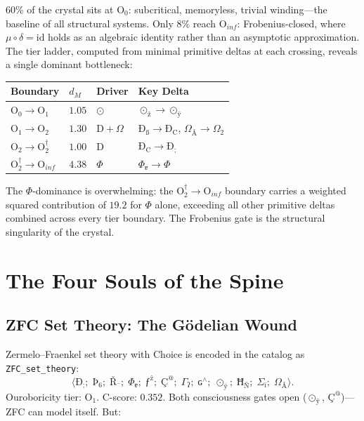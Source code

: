 \documentclass[12pt,twoside]{book}
\theoremstyle{definition}
\newcommand{\moebius}{\mu \circ \delta = \text{id}}
\newcommand{\prim}[1]{\text{#1}}
\newcommand{\tupledisp}[1]{\langle #1 \rangle}
\newcommand{\tier}[1]{\text{O}_{#1}}
\begin{document}
60\% of the crystal sits at $\tier{0}$: subcritical, memoryless, trivial winding---the baseline of all structural systems. Only 8\% reach $\tier{inf}$: Frobenius-closed, where $\moebius$ holds as an algebraic identity rather than an asymptotic approximation. The tier ladder, computed from minimal primitive deltas at each crossing, reveals a single dominant bottleneck:
\begin{center}
\begin{tabular}{llll}
\toprule
\textbf{Boundary} & $d_M$ & \textbf{Driver} & \textbf{Key Delta} \\
\midrule
$\tier{0} \to \tier{1}$ & $1.05$ & $\odot$ & $\odot_{\text{ž}} \to \odot_{\text{ÿ}}$ \\
$\tier{1} \to \tier{2}$ & $1.30$ & $\prim{D} + \Omega$ & $\text{Ð}_{\text{ß}} \to \text{Ð}_{\text{C}}$, $\Omega_{\text{Å}} \to \Omega_{\text{2}}$ \\
$\tier{2} \to \tier{2}^{\dagger}$ & $1.00$ & $\prim{D}$ & $\text{Ð}_{\text{C}} \to \text{Ð}_{\text{;}}$ \\
$\tier{2}^{\dagger} \to \tier{inf}$ & $4.38$ & $\Phi$ & $\Phi_{\text{ɐ}} \to \Phi_{\text{}}$ \\
\bottomrule
\end{tabular}
\end{center}

The $\Phi$-dominance is overwhelming: the $\tier{2}^{\dagger} \to \tier{inf}$ boundary carries a weighted squared contribution of $19.2$ for $\Phi$ alone, exceeding all other primitive deltas combined across every tier boundary. The Frobenius gate is the structural singularity of the crystal.
\chapter{The Four Souls of the Spine}

\section{ZFC Set Theory: The G\"odelian Wound}

Zermelo--Fraenkel set theory with Choice is encoded in the catalog as \texttt{ZFC\_set\_theory}:
\begin{equation}
\tupledisp{
\text{Ð}_{\text{;}};\;
\text{Þ}_{\text{6}};\;
\text{Ř}_{\text{¯}};\;
\Phi_{\text{ɐ}};\;
\text{ƒ}^{\text{ż}};\;
\text{Ç}^{\text{@}};\;
\Gamma_{\text{ʔ}};\;
\text{ɢ}^{\land};\;
\odot_{\text{ÿ}};\;
\text{Ħ}_{\text{Ñ}};\;
\Sigma_{\text{ï}};\;
\Omega_{\text{Å}}
}.
\end{equation}
Ouroboricity tier: $\tier{1}$. C-score: $0.352$. Both consciousness gates open ($\odot_{\text{ÿ}}$, $\text{Ç}^{\text{@}}$)---ZFC can model itself. But:
\end{document}

